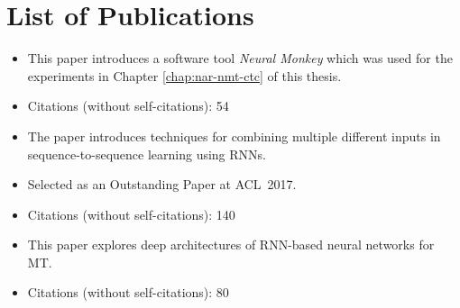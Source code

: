 \chapter*{List of Publications}




\noindent{}
\begin{itemize}[noitemsep,topsep=0pt]

\item This paper introduces a software tool \emph{Neural Monkey} which was used
  for the experiments in Chapter \ref{chap:nar-nmt-ctc} of this thesis.

\item Citations (without self-citations): 54
\end{itemize}\vspace{.5\baselineskip}

\noindent{}
\begin{itemize}[noitemsep,topsep=0pt]

\item The paper introduces techniques for combining multiple different inputs
  in sequence-to-sequence learning using RNNs.
\item Selected as an Outstanding Paper at ACL~2017.

\item Citations (without self-citations): 140
\end{itemize}\vspace{.5\baselineskip}

\noindent{}
\begin{itemize}[noitemsep,topsep=0pt]

\item This paper explores deep architectures of RNN-based neural networks for
  MT.

\item Citations (without self-citations): 80
\end{itemize}\vspace{.5\baselineskip}

